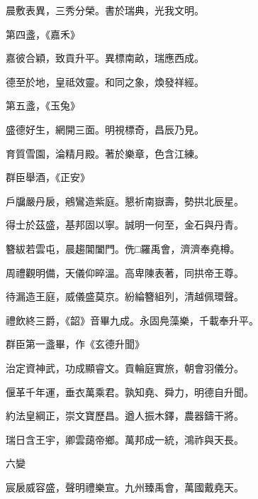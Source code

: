 \begin{pinyinscope}
 晨敷表異，三秀分榮。書於瑞典，光我文明。



 第四盞，《嘉禾》



 嘉彼合穎，致貢升平。異標南畝，瑞應西成。



 德至於地，皇祗效靈。和同之象，煥發祥經。



 第五盞，《玉兔》



 盛德好生，網開三面。明視標奇，昌辰乃見。



 育質雪園，淪精月殿。著於樂章，色含江練。



 群臣舉酒，《正安》



 戶牖嚴丹扆，鵷鸞造紫庭。懇祈南嶽壽，勢拱北辰星。



 得士於茲盛，基邦固以寧。誠明一何至，金石與丹青。



 簪紱若雲屯，晨趨閶闔門。侁□羅禹會，濟濟奉堯樽。



 周禮觀明備，天儀仰晬溫。高卑陳表著，同拱帝王尊。



 待漏造王庭，威儀盛莫京。紛綸簪組列，清越佩環聲。



 禮飲終三爵，《韶》音畢九成。永固鳧藻樂，千載奉升平。



 群臣第一盞畢，作《玄德升聞》



 治定資神武，功成顯睿文。貢輪庭實旅，朝會羽儀分。



 偃革千年運，垂衣萬乘君。孰知堯、舜力，明德自升聞。



 約法皇綱正，崇文寶歷昌。遒人振木鐸，農器鑄干將。



 瑞日含王宇，卿雲藹帝鄉。萬邦成一統，鴻祚與天長。



 六變



 宸扆威容盛，聲明禮樂宣。九州臻禹會，萬國戴堯天。




\end{pinyinscope}
